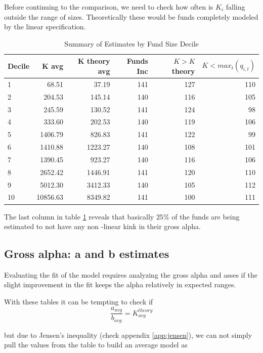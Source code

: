 \documentclass[12pt]{article}
\begin{document}
\par
Before continuing to the comparison, we need to check how often is $K_i$ falling outside the range of sizes. Theoretically these would be funds completely modeled by the linear specification.

\begin{table}[h!]
    \centering
    \caption{Summary of Estimates by Fund Size Decile}
    \label{tab:decile-funds-maxTNA}
    \begin{tabular}{lrrrrr}
        \hline
        Decile & K avg & K theory avg & Funds Inc &  $K>K$ theory & $K< max_t(q_{i,t})$ \\
        \hline
        1 & 68.51 & 37.19 & 141 & 127 & 110 \\
        2 & 204.53 & 145.14 & 140 & 116 & 105 \\
        3 & 245.59 & 130.52 & 141 & 124 & 98 \\
        4 & 333.60 & 202.53 & 140 & 119 & 106 \\
        5 & 1406.79 & 826.83 & 141 & 122 & 99 \\
        6 & 1410.88 & 1223.27 & 140 & 108 & 101 \\
        7 & 1390.45 & 923.27 & 140 & 116 & 106 \\
        8 & 2652.42 & 1446.91 & 141 & 120 & 110 \\
        9 & 5012.30 & 3412.33 & 140 & 105 & 112 \\
        10 & 10856.63 & 8349.82 & 141 & 100 & 111 \\
        \hline
    \end{tabular}
\end{table}

The last column in table \ref{tab:decile-funds-maxTNA} reveals that basically $25\%$ of the funds are being estimated to not have any non -linear kink in their gross alpha.


\subsection{Gross alpha: a and b estimates}
Evaluating the fit of the model requires analyzing the gross alpha and asses if the slight improvement in the fit keeps the alpha relatively in expected ranges.


With these tables it can be tempting to check if 
$$
\frac{a_{avg}}{b_{avg}}=K^{theory}_{avg}
$$

but due to Jensen's inequality (check appendix \ref{app:jensen}), we can not simply pull the values from the table to build an average model as
\end{document}
